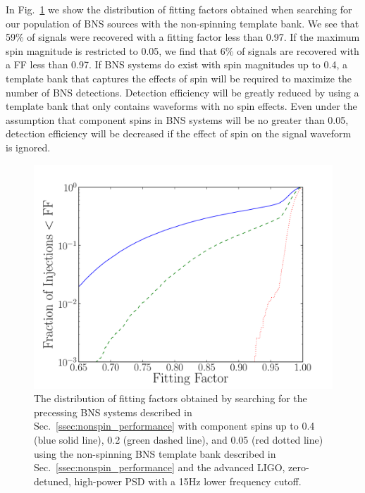 In Fig.~\ref{fig:no_spin_cover} we show the distribution of fitting factors
obtained when searching for our population of BNS sources with the
non-spinning template bank. We see that 59\% of signals were recovered with a
fitting factor less than 0.97.  If the maximum spin magnitude is restricted to
0.05, we find that 6\% of signals are recovered with a FF less
than 0.97.  If BNS systems do exist with spin magnitudes up to 0.4, a template
bank that captures the effects of spin will be required to maximize the number
of BNS detections.  Detection efficiency will be greatly reduced by using a
template bank that only contains waveforms with no spin effects.  Even under
the assumption that component spins in BNS systems will be no greater
than 0.05, detection efficiency will be decreased if the effect of spin on the
signal waveform is ignored.

\begin{figure}
\begin{center}
\includegraphics[width=1.0\textwidth]{papers/bns_spin/figure1.pdf}
\end{center}
\caption{\label{fig:no_spin_cover} The distribution of fitting factors obtained by searching
for the precessing BNS systems described in  Sec.~\ref{ssec:nonspin_performance}
with component spins up to 0.4 (blue solid line), 0.2 (green dashed line), and 0.05 (red dotted line) using the non-spinning
BNS template bank described in Sec.~\ref{ssec:nonspin_performance} and the advanced LIGO, zero-detuned,
high-power PSD with a 15Hz lower frequency cutoff.}
\end{figure}


